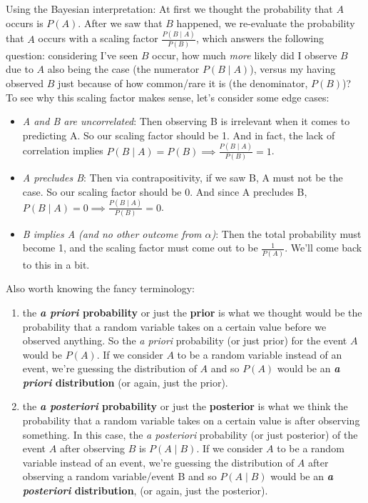 \documentclass[../main/main.tex]{subfiles}
\begin{document}
Using the Bayesian interpretation: At first we thought the probability
that \(A\) occurs is \(P(A)\). After we saw that \(B\) happened, we
re-evaluate the probability that \(A\) occurs with a scaling factor \(
\frac {P(B \mid A)} {P(B)} \), which answers the following question: considering I've
seen \(B\) occur, how much \emph{more} likely did I observe \(B\) due to
\(A\) also being the case (the numerator \(P(B \mid A)\)), versus my having observed
\(B\) just because of how common/rare it is (the denominator, \(P(B)\))? To see
why this scaling factor makes sense, let's consider some edge cases:

\begin{itemize}
  \tightlist
  \item 
    \emph{A and B are uncorrelated}: Then observing B is irrelevant when it comes
    to predicting A. So our scaling factor should be 1. And in fact, the lack of 
    correlation implies \(P(B \mid A) = P(B) \implies \frac {P(B \mid A)} {P(B)} = 1\).
  \item
    \emph{A precludes B}: Then via contrapositivity, if we saw B, A must not be the case.
    So our scaling factor should be 0. And since A precludes B,
    \(P(B \mid A) = 0 \implies \frac {P(B \mid A)} {P(B)} = 0\).
  \item
    \emph{B implies A (and no other outcome from \(\alpha\))}:
    Then the total probability
    must become 1, and the scaling factor must come out to be \(\frac {1} {P(A)}\).
    We'll come back to this in a bit.
\end{itemize}

Also worth knowing the fancy terminology: 
\begin{enumerate}
  \tightlist
  \item
    the \textbf{\textit{a priori} probability} or just the \textbf{prior} 
    is what 
    we thought would be the
    probability that a random variable takes on a certain value before we
    observed anything. So the \emph{a priori} probability (or just prior)
    for the event \(A\) would be \(P(A)\). If we consider \(A\) to be a
    random variable instead of an event, we're guessing the distribution of
    \(A\) and so \(P(A)\) would be an \textbf{\textit{a priori} distribution}
    (or again, just the prior). 
  \item
    the \textbf{\textit{a posteriori}
    probability} or just the \textbf{posterior}
    is what we think the
    probability that a random variable takes on a certain value is after
    observing something. In this case, the \emph{a posteriori} probability
    (or just posterior) of the event \(A\) after observing \(B\) is
    \(P(A \mid B)\). If we consider \(A\) to be a random variable instead of
    an event, we're guessing the distribution of \(A\) after observing a
    random variable/event B and so \(P(A \mid B)\) would be an
    \textbf{\textit{a posteriori} distribution}, (or again, just the
    posterior).
\end{enumerate}
\end{document}
